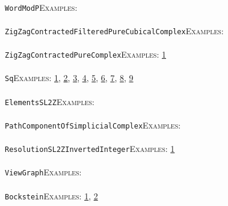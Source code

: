 \documentclass[a4paper,11pt]{report}
\begin{document}
{{ \\
 \texttt{WordModP}{\nobreakspace}{\nobreakspace}{\nobreakspace}{\nobreakspace}\textsc{Examples:} \\
 \\
 \texttt{ZigZagContractedFilteredPureCubicalComplex}{\nobreakspace}{\nobreakspace}{\nobreakspace}{\nobreakspace}\textsc{Examples:} \\
 \\
 \texttt{ZigZagContractedPureComplex}{\nobreakspace}{\nobreakspace}{\nobreakspace}{\nobreakspace}\textsc{Examples:} \href{../www/SideLinks/About/aboutPeripheral.html} {1}{\nobreakspace} \\
 \\
 \texttt{Sq}{\nobreakspace}{\nobreakspace}{\nobreakspace}{\nobreakspace}\textsc{Examples:} \href{tutorial/chap7.html} {1}{\nobreakspace}, \href{../www/SideLinks/About/aboutArtinGroups.html} {2}{\nobreakspace}, \href{../www/SideLinks/About/aboutModPRings.html} {3}{\nobreakspace}, \href{../www/SideLinks/About/aboutAspherical.html} {4}{\nobreakspace}, \href{../www/SideLinks/About/aboutNonabelian.html} {5}{\nobreakspace}, \href{../www/SideLinks/About/aboutQuandles2.html} {6}{\nobreakspace}, \href{../www/SideLinks/About/aboutKnots.html} {7}{\nobreakspace}, \href{../www/SideLinks/About/aboutTensorSquare.html} {8}{\nobreakspace}, \href{../www/SideLinks/About/aboutKnotsQuandles.html} {9}{\nobreakspace} \\
 \\
 \texttt{ElementsSL2Z}{\nobreakspace}{\nobreakspace}{\nobreakspace}{\nobreakspace}\textsc{Examples:} \\
 \\
 \texttt{PathComponentOfSimplicialComplex}{\nobreakspace}{\nobreakspace}{\nobreakspace}{\nobreakspace}\textsc{Examples:} \\
 \\
 \texttt{ResolutionSL2ZInvertedInteger}{\nobreakspace}{\nobreakspace}{\nobreakspace}{\nobreakspace}\textsc{Examples:} \href{tutorial/chap10.html} {1}{\nobreakspace} \\
 \\
 \texttt{ViewGraph}{\nobreakspace}{\nobreakspace}{\nobreakspace}{\nobreakspace}\textsc{Examples:} \\
 \\
 \texttt{Bockstein}{\nobreakspace}{\nobreakspace}{\nobreakspace}{\nobreakspace}\textsc{Examples:} \href{tutorial/chap7.html} {1}{\nobreakspace}, \href{../www/SideLinks/About/aboutModPRings.html} {2}{\nobreakspace} \\
}}
\end{document}
